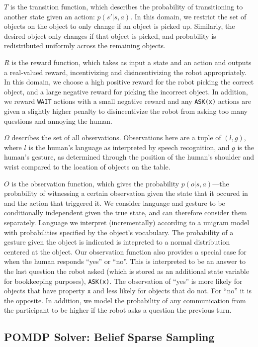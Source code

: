 \documentclass{article}
\begin{document}
$T$ is the transition function, which describes the probability of transitioning to another state given an action: $p(s'|s, a)$. In this domain, we restrict the set of objects on the object to only change if an object is picked up. Similarly, the desired object only changes if that object is picked, and probability is redistributed uniformly across the remaining objects. 


$R$ is the reward function, which takes as input a state and an action and outputs a real-valued reward, incentivizing and disincentivizing the robot appropriately. In this domain, we choose a high positive reward for the robot picking the correct object, and a large negative reward for picking the incorrect object. In addition, we reward \texttt{WAIT} actions with a small negative reward and any \texttt{ASK(x)} actions are given a slightly higher penalty to disincentivize the robot from asking too many questions and annoying the human. 

$\Omega$ describes the set of all observations. Observations here are a tuple of $(l,g)$, where $l$ is the human's language as interpreted by speech recognition, and $g$ is the human's gesture, as determined through the position of the human's shoulder and wrist compared to the location of objects on the table. 

$O$ is the observation function, which gives the probability $p(o|s, a)$---the probability of witnessing a certain observation given the state that it occured in and the action that triggered it. We consider language and gesture to be conditionally independent given the true state, and can therefore consider them separately. Language we interpret (incrementally) according to a unigram model with probabilities specified by the object's vocabulary. The probability of a gesture given the object is indicated is intepreted to a normal distribution centered at the object. Our observation function also provides a special case for when the human responds ``yes'' or ``no''. This is interpreted to be an answer to the last question the robot asked (which is stored as an additional state variable for bookkeeping purposes), \texttt{ASK(x)}. The observation of ``yes'' is more likely for objects that have property \texttt{x} and less likely for objects that do not. For ``no'' it is the opposite. In addition, we model the probability of any communication from the participant to be higher if the robot asks a question the previous turn. 

\subsection{POMDP Solver: Belief Sparse Sampling}
\end{document}
